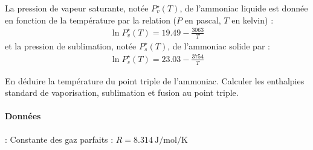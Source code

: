 \begin{exercise}
La pression de vapeur saturante, notée $P_v^\star (T)$, de l'ammoniac liquide est donnée en fonction de la température par la relation ($P$ en pascal, $T$ en kelvin) :
\begin{align}
\ln P_v^\star (T) = 19.49 - \frac{3063}{T}
\end{align}
et la pression de sublimation, notée $P_s^\star (T)$, de l'ammoniac solide par :
\begin{align}
\ln P_s^\star (T) = 23.03 - \frac{3754}{T}
\end{align}
\begin{questions}
\question En déduire la température du point triple de l'ammoniac.
\question Calculer les enthalpies standard de vaporisation, sublimation et fusion au point triple.
\end{questions}
\paragraph*{Données} : 
Constante des gaz parfaits : $R = 8.314 ~ \si{\joule\per\mole\per\kelvin}$

\end{exercise}